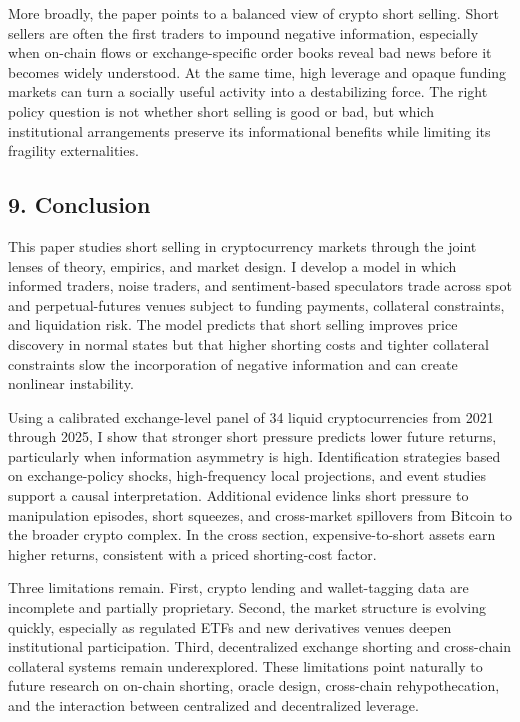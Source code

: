 \documentclass[
]{article}
\begin{document}
More broadly, the paper points to a balanced view of crypto short
selling. Short sellers are often the first traders to impound negative
information, especially when on-chain flows or exchange-specific order
books reveal bad news before it becomes widely understood. At the same
time, high leverage and opaque funding markets can turn a socially
useful activity into a destabilizing force. The right policy question is
not whether short selling is good or bad, but which institutional
arrangements preserve its informational benefits while limiting its
fragility externalities.

\subsection{9. Conclusion}\label{9-conclusion}

This paper studies short selling in cryptocurrency markets through the
joint lenses of theory, empirics, and market design. I develop a model
in which informed traders, noise traders, and sentiment-based
speculators trade across spot and perpetual-futures venues subject to
funding payments, collateral constraints, and liquidation risk. The
model predicts that short selling improves price discovery in normal
states but that higher shorting costs and tighter collateral constraints
slow the incorporation of negative information and can create nonlinear
instability.

Using a calibrated exchange-level panel of 34 liquid cryptocurrencies
from 2021 through 2025, I show that stronger short pressure predicts
lower future returns, particularly when information asymmetry is high.
Identification strategies based on exchange-policy shocks,
high-frequency local projections, and event studies support a causal
interpretation. Additional evidence links short pressure to manipulation
episodes, short squeezes, and cross-market spillovers from Bitcoin to
the broader crypto complex. In the cross section, expensive-to-short
assets earn higher returns, consistent with a priced shorting-cost
factor.

Three limitations remain. First, crypto lending and wallet-tagging data
are incomplete and partially proprietary. Second, the market structure
is evolving quickly, especially as regulated ETFs and new derivatives
venues deepen institutional participation. Third, decentralized exchange
shorting and cross-chain collateral systems remain underexplored. These
limitations point naturally to future research on on-chain shorting,
oracle design, cross-chain rehypothecation, and the interaction between
centralized and decentralized leverage.
\end{document}
